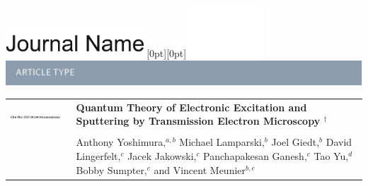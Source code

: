 \documentclass[twoside,twocolumn,9pt]{article}
\begin{document}
  \begin{@twocolumnfalse}
{\includegraphics[height=30pt]{head_foot/journal_name}\hfill\raisebox{0pt}[0pt][0pt]{\includegraphics[height=55pt]{head_foot/RSC_LOGO_CMYK}}\\[1ex]
\includegraphics[width=18.5cm]{head_foot/header_bar}}\par
\vspace{1em}
\sffamily
\begin{tabular}{m{4.5cm} p{13.5cm} }

\includegraphics{head_foot/DOI} &
\noindent\LARGE{\textbf{%
  Quantum Theory of Electronic Excitation and Sputtering
  by Transmission Electron Microscopy%
  $^\dag$
}} \\%
\vspace{0.3cm} & \vspace{0.3cm} \\

& \noindent\large{%
  Anthony Yoshimura,$^{a,b}$
  Michael Lamparski,$^b$
  Joel Giedt,$^b$
  David Lingerfelt,$^c$
  Jacek Jakowski,$^c$
  Panchapakesan Ganesh,$^c$
  Tao Yu,$^d$
  Bobby Sumpter,$^c$
  and
  Vincent Meunier$^{b,e}$
} \\%


\end{tabular}
\end{@twocolumnfalse}
\end{document}
